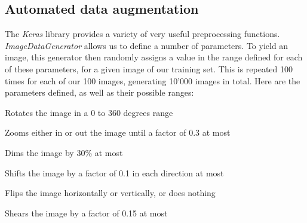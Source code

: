 \documentclass[10pt,conference,a4paper]{IEEEtran}
\newcommand*\desc[1]{\item[\textbf{#1}]}
\begin{document}
\subsection{Automated data augmentation}
\label{augm}

The \textit{Keras} library \cite{keras} provides a variety of very useful preprocessing functions.
\textit{ImageDataGenerator} allows us to define a number of parameters.
To yield an image, this generator then randomly assigns a value in the range defined for each of these parameters, for a given image of our training set.
This is repeated 100 times for each of our 100 images, generating 10'000 images in total.
Here are the parameters defined, as well as their possible ranges:

\begin{description}
    \desc{Rotation} Rotates the image in a 0 to 360 degrees range
    \desc{Zoom} Zooms either in or out the image until a factor of 0.3 at most
    \desc{Brightness} Dims the image by 30\% at most
    \desc{Shifting} Shifts the image by a factor of 0.1 in each direction at most
    \desc{Flipping} Flips the image horizontally or vertically, or does nothing
    \desc{Shearing} Shears the image by a factor of 0.15 at most
\end{description}
\end{document}
